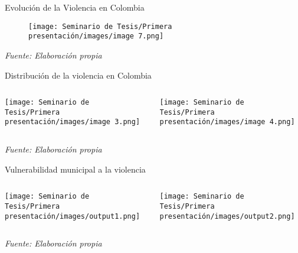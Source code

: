 \begin{frame}{Evolución de la Violencia en Colombia}
    \begin{figure}[ht]
        \centering
        \texttt{[image: Seminario de Tesis/Primera presentación/images/image 7.png]}
    \end{figure}
    \centering
    \footnotesize\textit{Fuente: Elaboración propia}
\end{frame}

\begin{frame}{Distribución de la violencia en Colombia}
    \begin{columns}[T]
        \begin{column}{0.48\textwidth}
            \centering
            \texttt{[image: Seminario de Tesis/Primera presentación/images/image 3.png]}
        \end{column}
        
        \begin{column}{0.48\textwidth}
            \centering
            \texttt{[image: Seminario de Tesis/Primera presentación/images/image 4.png]}
        \end{column}
    \end{columns}
    \vspace{0.2cm}
    \centering
    \footnotesize\textit{Fuente: Elaboración propia}
\end{frame}


\begin{frame}{Vulnerabilidad municipal a la violencia}
    \begin{columns}[T]
        \begin{column}{0.48\textwidth}
            \centering
            \texttt{[image: Seminario de Tesis/Primera presentación/images/output1.png]}
        \end{column}
        
        \begin{column}{0.48\textwidth}
            \centering
            \texttt{[image: Seminario de Tesis/Primera presentación/images/output2.png]}
        \end{column}
    \end{columns}
    \vspace{0.2cm}
    \centering
    \footnotesize\textit{Fuente: Elaboración propia}
\end{frame}